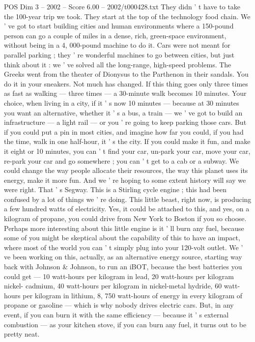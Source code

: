 \begin{textsample}{POS Dim 3 – 2002 – Score 6.00 – 2002/t000428.txt}
They didn ' t have to take the 100-year trip we took.
They start at the top of the technology food chain.
We ' ve got to start building cities and human environments where a 150-pound person can go a couple of miles in a dense, rich, green-space environment, without being in a 4, 000-pound machine to do it.
Cars were not meant for parallel parking ; they ' re wonderful machines to go between cities, but just think about it : we ' ve solved all the long-range, high-speed problems.
The Greeks went from the theater of Dionysus to the Parthenon in their sandals.
You do it in your sneakers.
Not much has changed.
If this thing goes only three times as fast as walking — three times — a 30-minute walk becomes 10 minutes.
Your choice, when living in a city, if it ' s now 10 minutes — because at 30 minutes you want an alternative, whether it ' s a bus, a train — we ' ve got to build an infrastructure — a light rail — or you ' re going to keep parking those cars.
But if you could put a pin in most cities, and imagine how far you could, if you had the time, walk in one half-hour, it ' s the city.
If you could make it fun, and make it eight or 10 minutes, you can ' t find your car, un-park your car, move your car, re-park your car and go somewhere ; you can ' t get to a cab or a subway.
We could change the way people allocate their resources, the way this planet uses its energy, make it more fun.
And we ' re hoping to some extent history will say we were right.
That ' s Segway.
This is a Stirling cycle engine ; this had been confused by a lot of things we ' re doing.
This little beast, right now, is producing a few hundred watts of electricity.
Yes, it could be attached to this, and yes, on a kilogram of propane, you could drive from New York to Boston if you so choose.
Perhaps more interesting about this little engine is it ' ll burn any fuel, because some of you might be skeptical about the capability of this to have an impact, where most of the world you can ' t simply plug into your 120-volt outlet.
We ' ve been working on this, actually, as an alternative energy source, starting way back with Johnson \& Johnson, to run an iBOT, because the best batteries you could get — 10 watt-hours per kilogram in lead, 20 watt-hours per kilogram nickel- cadmium, 40 watt-hours per kilogram in nickel-metal hydride, 60 watt-hours per kilogram in lithium, 8, 750 watt-hours of energy in every kilogram of propane or gasoline — which is why nobody drives electric cars.
But, in any event, if you can burn it with the same efficiency — because it ' s external combustion — as your kitchen stove, if you can burn any fuel, it turns out to be pretty neat.

\end{textsample}
